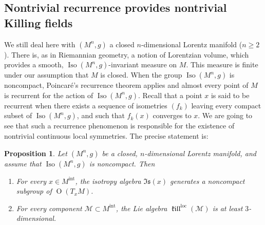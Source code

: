 \documentclass[11pt]{article}
\newtheorem{prop}[theo]{Proposition}
\theoremstyle{definition}
\numberwithin{equation}{section}
\numberwithin{figure}{section}
\numberwithin{table}{section}
\DeclareMathOperator{\Iso}{Iso}
\DeclareMathOperator{\loc}{loc}
\newcommand{\mint}{{M^{\intl}}}
\DeclareMathOperator{\intl}{int}
\DeclareMathOperator{\kil}{{\mathfrak{kill}}}
\newcommand{\kiloc}{\kil^{\loc}}
\begin{document}
\subsection{Nontrivial recurrence provides nontrivial Killing fields}\label{sec.recurrence}
We still deal here with $(M^n,g)$ a closed $n$-dimensional Lorentz manifold ($n \geq 2$). There is, as in Riemannian geometry, a notion of Lorentzian volume, which provides a smooth, $\Iso(M^n,g)$-invariant measure on $M$. This measure is finite under our assumption that $M$ is closed. When the group $\Iso(M^n,g)$ is noncompact, Poincaré's recurrence theorem applies and almost every point of $M$ is recurrent for the action of $\Iso(M^n,g)$. Recall that a point $x$ is said to be recurrent when there exists a sequence of isometries $(f_k)$ leaving every compact subset of $\Iso(M^n,g)$, and such that $f_k(x)$ converges to $x$. We are going to see that such a recurrence phenomenon is responsible for the existence of nontrivial continuous local symmetries. The precise statement is:

\begin{prop}\label{prop.dimension}
Let $(M^n,g)$ be a closed, $n$-dimensional Lorentz manifold, and assume that $\Iso(M^n,g)$ is noncompact. Then
\begin{enumerate}
\item \label{list3.5.1}For every $x \in \mint$, the isotropy algebra $\mathfrak{Is}(x)$ generates a noncompact subgroup of ${\operatorname O}(T_xM)$.
\item \label{list3.5.2}For every component ${\mathcal M} \subset \mint$, the Lie algebra $\kiloc({\mathcal M})$ is at least $3$-dimensional.
\end{enumerate}
\end{prop}
\end{document}
